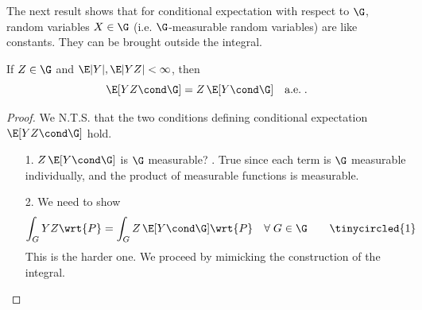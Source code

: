 \documentclass{article} %
\begin{document}
The next result shows that for conditional expectation with respect to $\G$, random variables $X \in \G$ (i.e. $\G$-measurable random variables) are like constants. They can be brought outside the integral.

\begin{theorem}
If $Z \in \G$ and $\E|Y|, \E|YZ| < \infty$, then 
\[  \E[YZ \cond \G] = Z \, \E[Y \cond \G] \quad \text{a.e.} \; .\]
\label{thm:measurable_random_variables_behave_like_constants_with_respect_to_conditional_expectations}
\end{theorem}

\begin{proof}
We N.T.S. that the two conditions defining conditional expectation $\E[YZ \cond \G]$ hold.  
\begin{itemize}
\item[1.] $Z \, \E[Y \cond \G]$ is $\G$ measurable?  \greencheck. True since each term is $\G$ measurable individually, and the product of measurable functions is measurable.  
\item[2.] We need to show 
%
\begin{align*}
\int_{G} YZ \wrt{P} = \int_{G} Z \, \E[Y \cond \G]\wrt{P} \quad \forall \; G \in \G \quad\quad \tinycircled{1}
\end{align*}
%
 This is the harder one.  We proceed by mimicking the construction of the integral. 
%
\end{itemize}
\end{proof}
\end{document}
